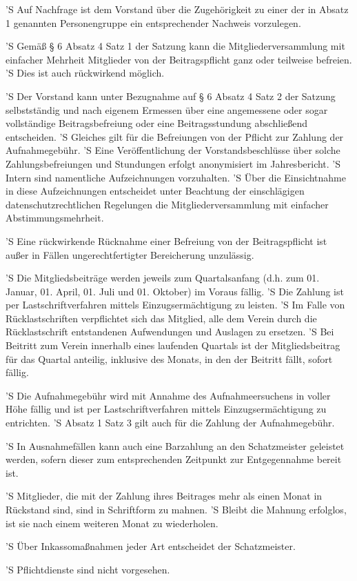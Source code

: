 \documentclass[a4paper,10pt]{scrreprt}
\begin{document}
\begin{contract}
'S Auf Nachfrage ist dem Vorstand über die Zugehörigkeit zu einer der in Absatz
1 genannten Personengruppe ein entsprechender Nachweis vorzulegen.

'S Gemäß § 6 Absatz 4 Satz 1 der Satzung kann die Mitgliederversammlung mit
einfacher Mehrheit Mitglieder von der Beitragspflicht ganz oder teilweise
befreien.
'S Dies ist auch rückwirkend möglich.

'S Der Vorstand kann unter Bezugnahme auf § 6 Absatz 4 Satz 2 der Satzung
selbstständig und nach eigenem Ermessen über eine angemessene oder sogar
vollständige Beitragsbefreiung oder eine Beitragsstundung abschließend
entscheiden.
'S Gleiches gilt für die Befreiungen von der Pflicht zur Zahlung der
Aufnahmegebühr.
'S Eine Veröffentlichung der Vorstandsbeschlüsse über solche
Zahlungsbefreiungen und Stundungen erfolgt anonymisiert im Jahresbericht.
'S Intern sind namentliche Aufzeichnungen vorzuhalten.
'S Über die Einsichtnahme in diese Aufzeichnungen entscheidet unter Beachtung
der einschlägigen datenschutzrechtlichen Regelungen die Mitgliederversammlung
mit einfacher Abstimmungsmehrheit.

'S Eine rückwirkende Rücknahme einer Befreiung von der Beitragspflicht ist
außer in Fällen ungerechtfertigter Bereicherung unzulässig.


'S Die Mitgliedsbeiträge werden jeweils zum Quartalsanfang (d.h. zum 01.
Januar, 01. April, 01. Juli und 01. Oktober) im Voraus fällig.
'S Die Zahlung ist per Lastschriftverfahren mittels Einzugsermächtigung zu
leisten.
'S Im Falle von Rücklastschriften verpflichtet sich das Mitglied, alle dem
Verein durch die Rücklastschrift entstandenen Aufwendungen und Auslagen zu
ersetzen.
'S Bei Beitritt zum Verein innerhalb eines laufenden Quartals ist der
Mitgliedsbeitrag für das Quartal anteilig, inklusive des Monats, in den der
Beitritt fällt, sofort fällig.

'S Die Aufnahmegebühr wird mit Annahme des Aufnahmeersuchens in voller Höhe
fällig und ist per Lastschriftverfahren mittels Einzugsermächtigung zu
entrichten.
'S Absatz 1 Satz 3 gilt auch für die Zahlung der Aufnahmegebühr.

'S In Ausnahmefällen kann auch eine Barzahlung an den Schatzmeister geleistet
werden, sofern dieser zum entsprechenden Zeitpunkt zur Entgegennahme bereit
ist.


'S Mitglieder, die mit der Zahlung ihres Beitrages mehr als einen Monat in
Rückstand sind, sind in Schriftform zu mahnen.
'S Bleibt die Mahnung erfolglos, ist sie nach einem weiteren Monat zu
wiederholen.

'S Über Inkassomaßnahmen jeder Art entscheidet der Schatzmeister.


'S Pflichtdienste sind nicht vorgesehen.

\end{contract}
\end{document}

